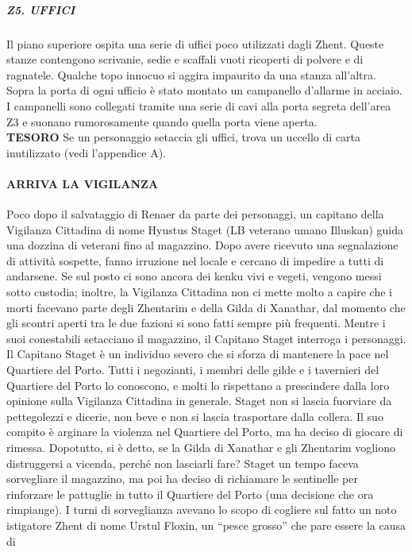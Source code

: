 \documentclass{article}
\begin{document}
\subparagraph{Z5. UFFICI}
Il piano superiore ospita una serie di uffici poco utilizzati
dagli Zhent. Queste stanze contengono scrivanie, sedie e
scaffali vuoti ricoperti di polvere e di ragnatele. Qualche
topo innocuo si aggira impaurito da una stanza all'altra.
Sopra la porta di ogni ufficio è stato montato un
campanello d'allarme in acciaio. I campanelli sono collegati
tramite una serie di cavi alla porta segreta dell'area Z3 e
suonano rumorosamente quando quella porta viene aperta. \\

\textbf{TESORO}
Se un personaggio setaccia gli uffici, trova un uccello di
carta inutilizzato (vedi l'appendice A).

\paragraph{ARRIVA LA VIGILANZA}
Poco dopo il salvataggio di Renaer da parte dei personaggi,
un capitano della Vigilanza Cittadina di nome Hyustus
Staget (LB veterano umano Illuskan) guida una dozzina
di veterani fino al magazzino. Dopo avere ricevuto una
segnalazione di attività sospette, fanno irruzione nel locale
e cercano di impedire a tutti di andarsene. Se sul posto ci
sono ancora dei kenku vivi e vegeti, vengono messi sotto
custodia; inoltre, la Vigilanza Cittadina non ci mette molto
a capire che i morti facevano parte degli Zhentarim e della
Gilda di Xanathar, dal momento che gli scontri aperti tra
le due fazioni si sono fatti sempre più frequenti. Mentre i
suoi conestabili setacciano il magazzino, il Capitano Staget
interroga i personaggi.
Il Capitano Staget è un individuo severo che si sforza
di mantenere la pace nel Quartiere del Porto. Tutti i
negozianti, i membri delle gilde e i tavernieri del Quartiere
del Porto lo conoscono, e molti lo rispettano a prescindere
dalla loro opinione sulla Vigilanza Cittadina in generale.
Staget non si lascia fuorviare da pettegolezzi e dicerie, non
beve e non si lascia trasportare dalla collera. Il suo compito
è arginare la violenza nel Quartiere del Porto, ma ha deciso
di giocare di rimessa. Dopotutto, si è detto, se la Gilda di
Xanathar e gli Zhentarim vogliono distruggersi a vicenda,
perché non lasciarli fare?
Staget un tempo faceva sorvegliare il magazzino, ma
poi ha deciso di richiamare le sentinelle per rinforzare le
pattuglie in tutto il Quartiere del Porto (una decisione che
ora rimpiange). I turni di sorveglianza avevano lo scopo di
cogliere sul fatto un noto istigatore Zhent di nome Urstul
Floxin, un “pesce grosso” che pare essere la causa di
\end{document}
